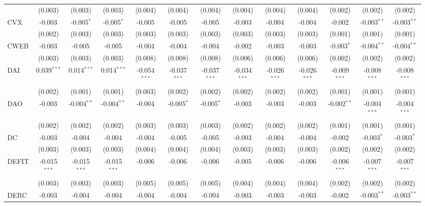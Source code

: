 \begin{table}[!htbp]
\begin{tabular}{@{\extracolsep{5pt}}lcccccccccccc}
  & (0.003) & (0.003) & (0.003) & (0.004) & (0.004) & (0.004) & (0.004) & (0.004) & (0.004) & (0.002) & (0.002) & (0.002) \\
 CVX & -0.003$^{}$ & -0.005$^{*}$ & -0.005$^{*}$ & -0.005$^{}$ & -0.005$^{}$ & -0.005$^{}$ & -0.003$^{}$ & -0.004$^{}$ & -0.004$^{}$ & -0.002$^{}$ & -0.003$^{**}$ & -0.003$^{**}$ \\
  & (0.002) & (0.003) & (0.003) & (0.003) & (0.003) & (0.003) & (0.003) & (0.003) & (0.003) & (0.001) & (0.001) & (0.001) \\
 CWEB & -0.003$^{}$ & -0.005$^{}$ & -0.005$^{}$ & -0.004$^{}$ & -0.004$^{}$ & -0.004$^{}$ & -0.002$^{}$ & -0.003$^{}$ & -0.003$^{}$ & -0.003$^{*}$ & -0.004$^{**}$ & -0.004$^{**}$ \\
  & (0.003) & (0.003) & (0.003) & (0.008) & (0.008) & (0.008) & (0.006) & (0.006) & (0.006) & (0.002) & (0.002) & (0.002) \\
 DAI & 0.039$^{***}$ & 0.014$^{***}$ & 0.014$^{***}$ & -0.054$^{***}$ & -0.037$^{***}$ & -0.037$^{***}$ & -0.034$^{***}$ & -0.026$^{***}$ & -0.026$^{***}$ & -0.009$^{***}$ & -0.008$^{***}$ & -0.008$^{***}$ \\
  & (0.002) & (0.001) & (0.001) & (0.003) & (0.002) & (0.002) & (0.002) & (0.002) & (0.002) & (0.001) & (0.001) & (0.001) \\
 DAO & -0.003$^{}$ & -0.004$^{**}$ & -0.004$^{**}$ & -0.004$^{}$ & -0.005$^{*}$ & -0.005$^{*}$ & -0.003$^{}$ & -0.003$^{}$ & -0.003$^{}$ & -0.002$^{**}$ & -0.004$^{***}$ & -0.004$^{***}$ \\
  & (0.002) & (0.002) & (0.002) & (0.003) & (0.003) & (0.003) & (0.002) & (0.002) & (0.002) & (0.001) & (0.001) & (0.001) \\
 DC & -0.003$^{}$ & -0.004$^{}$ & -0.004$^{}$ & -0.004$^{}$ & -0.005$^{}$ & -0.005$^{}$ & -0.003$^{}$ & -0.004$^{}$ & -0.004$^{}$ & -0.002$^{}$ & -0.003$^{*}$ & -0.003$^{*}$ \\
  & (0.003) & (0.003) & (0.003) & (0.004) & (0.004) & (0.004) & (0.003) & (0.003) & (0.003) & (0.002) & (0.002) & (0.002) \\
 DEFIT & -0.015$^{***}$ & -0.015$^{***}$ & -0.015$^{***}$ & -0.006$^{}$ & -0.006$^{}$ & -0.006$^{}$ & -0.005$^{}$ & -0.006$^{}$ & -0.006$^{}$ & -0.006$^{***}$ & -0.007$^{***}$ & -0.007$^{***}$ \\
  & (0.003) & (0.003) & (0.003) & (0.005) & (0.005) & (0.005) & (0.004) & (0.004) & (0.004) & (0.002) & (0.002) & (0.002) \\
 DERC & -0.003$^{}$ & -0.004$^{}$ & -0.004$^{}$ & -0.004$^{}$ & -0.004$^{}$ & -0.004$^{}$ & -0.003$^{}$ & -0.003$^{}$ & -0.003$^{}$ & -0.002$^{}$ & -0.003$^{**}$ & -0.003$^{**}$ \\

\end{tabular}
\end{table}
